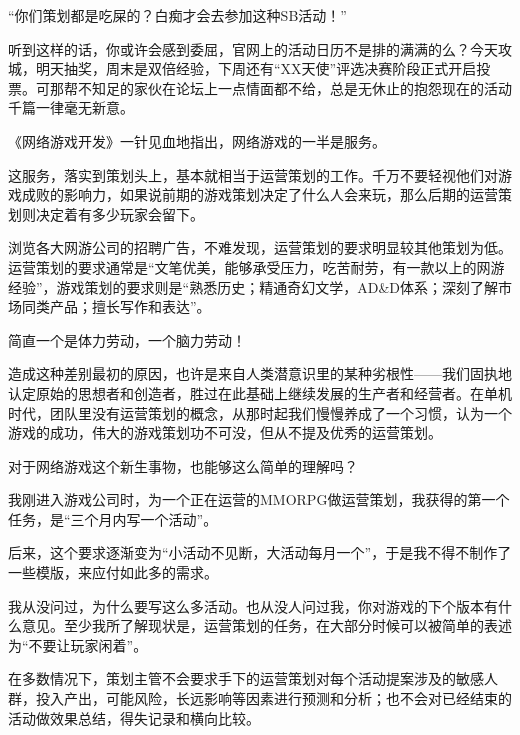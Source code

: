 \documentclass{article}
\begin{document}
“你们策划都是吃屎的？白痴才会去参加这种SB活动！”



听到这样的话，你或许会感到委屈，官网上的活动日历不是排的满满的么？今天攻城，明天抽奖，周末是双倍经验，下周还有“XX天使”评选决赛阶段正式开启投票。可那帮不知足的家伙在论坛上一点情面都不给，总是无休止的抱怨现在的活动千篇一律毫无新意。



《网络游戏开发》一针见血地指出，网络游戏的一半是服务。



这服务，落实到策划头上，基本就相当于运营策划的工作。千万不要轻视他们对游戏成败的影响力，如果说前期的游戏策划决定了什么人会来玩，那么后期的运营策划则决定着有多少玩家会留下。



浏览各大网游公司的招聘广告，不难发现，运营策划的要求明显较其他策划为低。运营策划的要求通常是“文笔优美，能够承受压力，吃苦耐劳，有一款以上的网游经验”，游戏策划的要求则是“熟悉历史；精通奇幻文学，AD&D体系；深刻了解市场同类产品；擅长写作和表达”。



简直一个是体力劳动，一个脑力劳动！



造成这种差别最初的原因，也许是来自人类潜意识里的某种劣根性——我们固执地认定原始的思想者和创造者，胜过在此基础上继续发展的生产者和经营者。在单机时代，团队里没有运营策划的概念，从那时起我们慢慢养成了一个习惯，认为一个游戏的成功，伟大的游戏策划功不可没，但从不提及优秀的运营策划。



对于网络游戏这个新生事物，也能够这么简单的理解吗？



我刚进入游戏公司时，为一个正在运营的MMORPG做运营策划，我获得的第一个任务，是“三个月内写一个活动”。



后来，这个要求逐渐变为“小活动不见断，大活动每月一个”，于是我不得不制作了一些模版，来应付如此多的需求。



我从没问过，为什么要写这么多活动。也从没人问过我，你对游戏的下个版本有什么意见。至少我所了解现状是，运营策划的任务，在大部分时候可以被简单的表述为“不要让玩家闲着”。



在多数情况下，策划主管不会要求手下的运营策划对每个活动提案涉及的敏感人群，投入产出，可能风险，长远影响等因素进行预测和分析；也不会对已经结束的活动做效果总结，得失记录和横向比较。
\end{document}
